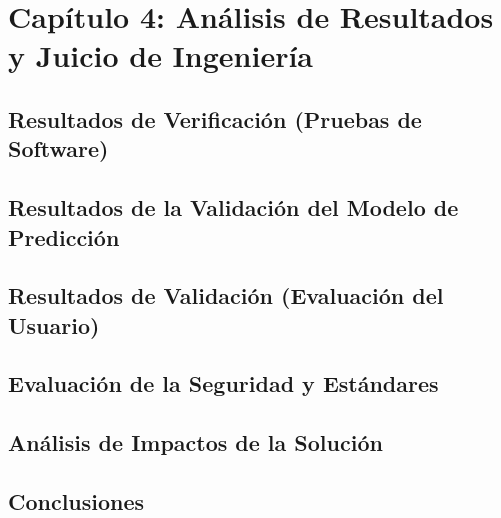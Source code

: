 \section{Capítulo 4: Análisis de Resultados y Juicio de Ingeniería}

\subsection{Resultados de Verificación (Pruebas de Software)}


\subsection{Resultados de la Validación del Modelo de Predicción}


\subsection{Resultados de Validación (Evaluación del Usuario)}



\subsection{Evaluación de la Seguridad y Estándares}


\subsection{Análisis de Impactos de la Solución}



\subsection{Conclusiones}



